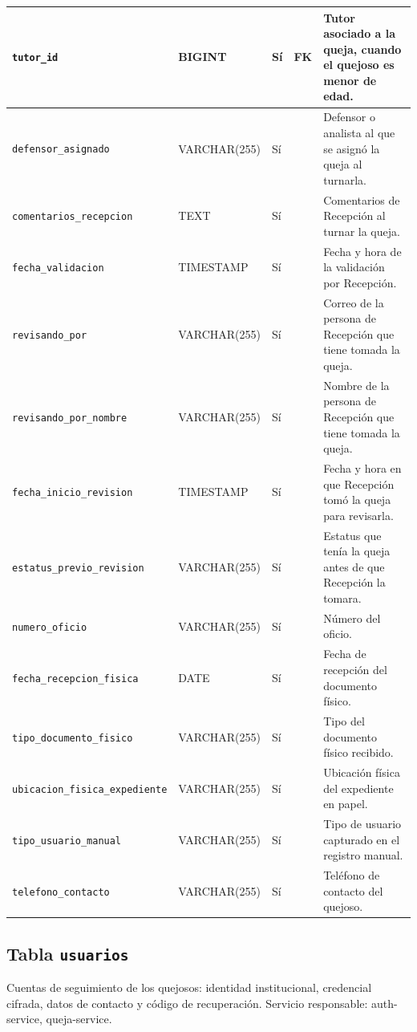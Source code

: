 \begin{longtable}{|L{3.9cm}|L{2.4cm}|L{0.9cm}|L{1.2cm}|L{6.6cm}|}
		\texttt{tutor\_\allowbreak{}id} & BIGINT & Sí & FK & Tutor asociado a la queja, cuando el quejoso es menor de edad. \\ \hline
		\texttt{defensor\_\allowbreak{}asignado} & VARCHAR(255) & Sí &  & Defensor o analista al que se asignó la queja al turnarla. \\ \hline
		\texttt{comentarios\_\allowbreak{}recepcion} & TEXT & Sí &  & Comentarios de Recepción al turnar la queja. \\ \hline
		\texttt{fecha\_\allowbreak{}validacion} & TIMESTAMP & Sí &  & Fecha y hora de la validación por Recepción. \\ \hline
		\texttt{revisando\_\allowbreak{}por} & VARCHAR(255) & Sí &  & Correo de la persona de Recepción que tiene tomada la queja. \\ \hline
		\texttt{revisando\_\allowbreak{}por\_\allowbreak{}nombre} & VARCHAR(255) & Sí &  & Nombre de la persona de Recepción que tiene tomada la queja. \\ \hline
		\texttt{fecha\_\allowbreak{}inicio\_\allowbreak{}revision} & TIMESTAMP & Sí &  & Fecha y hora en que Recepción tomó la queja para revisarla. \\ \hline
		\texttt{estatus\_\allowbreak{}previo\_\allowbreak{}revision} & VARCHAR(255) & Sí &  & Estatus que tenía la queja antes de que Recepción la tomara. \\ \hline
		\texttt{numero\_\allowbreak{}oficio} & VARCHAR(255) & Sí &  & Número del oficio. \\ \hline
		\texttt{fecha\_\allowbreak{}recepcion\_\allowbreak{}fisica} & DATE & Sí &  & Fecha de recepción del documento físico. \\ \hline
		\texttt{tipo\_\allowbreak{}documento\_\allowbreak{}fisico} & VARCHAR(255) & Sí &  & Tipo del documento físico recibido. \\ \hline
		\texttt{ubicacion\_\allowbreak{}fisica\_\allowbreak{}expediente} & VARCHAR(255) & Sí &  & Ubicación física del expediente en papel. \\ \hline
		\texttt{tipo\_\allowbreak{}usuario\_\allowbreak{}manual} & VARCHAR(255) & Sí &  & Tipo de usuario capturado en el registro manual. \\ \hline
		\texttt{telefono\_\allowbreak{}contacto} & VARCHAR(255) & Sí &  & Teléfono de contacto del quejoso. \\ \hline
\end{longtable}
\normalsize
\setlength{\tabcolsep}{6pt}
\renewcommand{\arraystretch}{1}

\subsection{Tabla \texttt{usuarios}}
Cuentas de seguimiento de los quejosos: identidad institucional, credencial cifrada, datos de contacto y código de recuperación. Servicio responsable: auth-service, queja-service.


